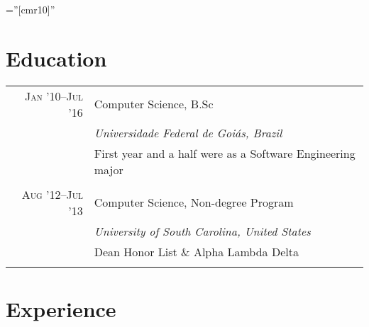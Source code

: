 \documentclass[a4paper,10pt]{article}
\begin{document}
\font\fb=''[cmr10]''


\section{Education}

\begin{tabular}{r|p{11cm}}

  \textsc{Jan '10--Jul '16} & Computer Science, B.Sc\\ &
  \emph{Universidade Federal de Goiás, Brazil} \\ &
  \footnotesize{First year and a half were as a Software Engineering major}
  \\\multicolumn{2}{c}{} \\

  \textsc{Aug '12--Jul '13} & Computer Science, Non-degree Program \\ &
  \emph{University of South Carolina, United States} \\ &
  \footnotesize{Dean Honor List \& Alpha Lambda Delta}
  \\\multicolumn{2}{c}{} \\
 
\end{tabular}

\section{Experience}

\setlength{\LTpre}{0pt}
\setlength{\LTpost}{0pt}
\end{document}
